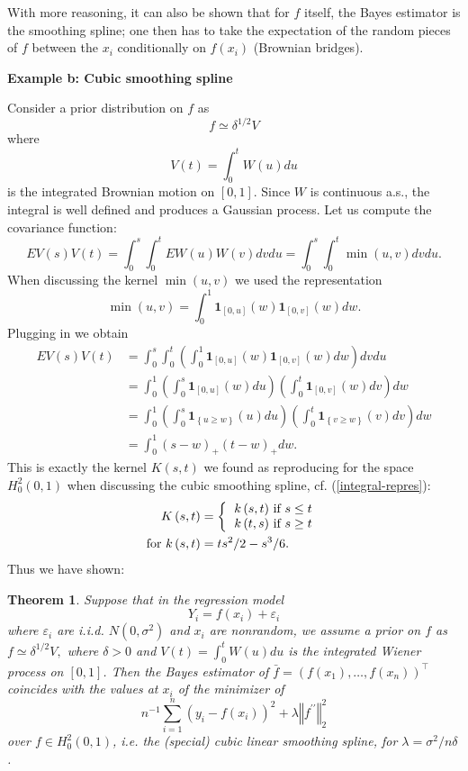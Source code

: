 \documentclass[11pt,twoside]{article}%
\theoremstyle{change}
\newtheorem{theorem}{Theorem}[section]
\begin{document}
With more reasoning, it can also be shown that for $f$ itself, the Bayes
estimator is the smoothing spline; one then has to take the expectation of the
random pieces of $f$ between the $x_{i}$ conditionally on $f(x_{i})$ (Brownian bridges).

\textbf{Example b: Cubic smoothing spline }

Consider a prior distribution on $f$ as
\[
f\simeq\delta^{1/2}V
\]
where
\[
V(t)=\int_{0}^{t}W(u)du
\]
is the integrated Brownian motion on $[0,1]$. Since $W$ is continuous a.s.,
the integral is well defined and produces a Gaussian process. Let us compute
the covariance function:
\[
EV(s)V(t)=\int_{0}^{s}\int_{0}^{t}EW(u)W(v)dvdu=\int_{0}^{s}\int_{0}^{t}%
\min\left(  u,v\right)  dvdu.
\]
When discussing the kernel $\min\left(  u,v\right)  $ we used the
representation
\[
\min(u,v)=\int_{0}^{1}\mathbf{1}_{[0,u]}(w)\mathbf{1}_{[0,v]}(w)dw.
\]
Plugging in we obtain
\begin{align*}
EV(s)V(t)  & =\int_{0}^{s}\int_{0}^{t}\left(  \int_{0}^{1}\mathbf{1}%
_{[0,u]}(w)\mathbf{1}_{[0,v]}(w)dw\right)  dvdu\\
& =\int_{0}^{1}\left(  \int_{0}^{s}\mathbf{1}_{[0,u]}(w)du\right)  \left(
\int_{0}^{t}\mathbf{1}_{[0,v]}(w)dv\right)  dw\\
& =\int_{0}^{1}\left(  \int_{0}^{s}\mathbf{1}_{\left\{  u\geq w\right\}
}(u)du\right)  \left(  \int_{0}^{t}\mathbf{1}_{\left\{  v\geq w\right\}
}(v)dv\right)  dw\\
& =\int_{0}^{1}\left(  s-w\right)  _{+}\left(  t-w\right)  _{+}dw.
\end{align*}
This is exactly the kernel $K(s,t)$ we found as reproducing for the space
$H_{0}^{2}(0,1)$ when discussing the cubic smoothing spline, cf.
(\ref{integral-repres}):%
\begin{align*}
K\left(  s,t\right)   & =\left\{
\begin{tabular}
[c]{l}%
$k\left(  s,t\right)  $ if $s\leq t$\\
$k\left(  t,s\right)  $ if $s\geq t$%
\end{tabular}
\right. \\
\text{for }k\left(  s,t\right)   & =ts^{2}/2-s^{3}/6.
\end{align*}
Thus we have shown:

\begin{theorem}
Suppose that in the regression model
\[
Y_{i}=f(x_{i})+\varepsilon_{i}%
\]
where $\varepsilon_{i}$ are i.i.d. $N(0,\sigma^{2})$ and $x_{i}$ are
nonrandom, we assume a prior on $f$ as $f\simeq\delta^{1/2}V,$ where
$\delta>0$ and $V(t)=\int_{0}^{t}W(u)du$ is the integrated Wiener process on
$[0,1]$. Then the Bayes estimator of $\bar{f}=\left(  f(x_{1}),\ldots
,f(x_{n})\right)  ^{\top}$ coincides with the values at $x_{i}$ of the
minimizer of
\[
n^{-1}\sum_{i=1}^{n}\left(  y_{i}-f(x_{i})\right)  ^{2}+\lambda\left\Vert
f^{\prime\prime}\right\Vert _{2}^{2}%
\]
over $f\in H_{0}^{2}(0,1)$, i.e. the (special) cubic linear smoothing spline,
for $\lambda=\sigma^{2}/n\delta$.
\end{theorem}
\end{document}
